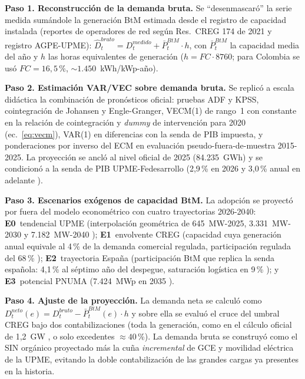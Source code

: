 \documentclass[11pt,letterpaper]{article}
\begin{document}
\textbf{Paso 1. Reconstrucción de la demanda bruta.} Se ``desenmascaró''
la serie medida sumándole la generación BtM estimada desde el registro de
capacidad instalada (reportes de operadores de red según Res.~CREG 174 de
2021 \cite{creg174} y registro AGPE-UPME):
$\widehat{D}^{bruto}_t = D^{medido}_t + \bar{P}^{BtM}_t\cdot h$, con
$\bar{P}^{BtM}_t$ la capacidad media del año y $h$ las horas equivalentes de
generación ($h=FC\cdot8760$; para Colombia se usó $FC=16{,}5$\,\%,
${\sim}1.450$~kWh/kWp-año).

\textbf{Paso 2. Estimación VAR/VEC sobre demanda bruta.} Se replicó a
escala didáctica la combinación de pronósticos oficial: pruebas ADF y KPSS,
cointegración de Johansen y Engle-Granger, VECM(1) de rango~1 con constante
en la relación de cointegración y \emph{dummy} de intervención para 2020
(ec.~\ref{eq:vecm}), VAR(1) en diferencias con la senda de PIB impuesta, y
ponderaciones por inverso del ECM en evaluación pseudo-fuera-de-muestra
2015-2025. La proyección se ancló al nivel oficial de 2025 (84.235~GWh) y
se condicionó a la senda de PIB UPME-Fedesarrollo (2,9\,\% en 2026 y
3,0\,\% anual en adelante \cite{upmeene2026}).

\textbf{Paso 3. Escenarios exógenos de capacidad BtM.} La adopción se
proyectó por fuera del modelo econométrico con cuatro trayectorias
2026-2040: \textbf{E0}~tendencial UPME (interpolación geométrica de
645~MW-2025, 3.331~MW-2030 y 7.182~MW-2040 \cite{upme2026,upmeene2026});
\textbf{E1}~envolvente CREG (capacidad cuya generación anual equivale al
4\,\% de la demanda comercial regulada, participación regulada del 68\,\%
\cite{upme2024}); \textbf{E2}~trayectoria España (participación BtM que
replica la senda española: 4,1\,\% al séptimo año del despegue, saturación
logística en 9\,\% \cite{appa2025}); y \textbf{E3}~potencial PNUMA
(7.424~MWp en 2035 \cite{pnuma2021}).

\textbf{Paso 4. Ajuste de la proyección.} La demanda neta se calculó como
$D^{neto}_t(e)=D^{bruto}_t-\bar{P}^{BtM}_t(e)\cdot h$ y sobre ella se evaluó
el cruce del umbral CREG bajo dos contabilizaciones (toda la generación,
como en el cálculo oficial de 1,2~GW \cite{creg901099}, o solo excedentes
${\approx}40$\,\%). La demanda bruta se construyó como el SIN orgánico
proyectado más la cuña \emph{incremental} de GCE y movilidad eléctrica de la
UPME, evitando la doble contabilización de las grandes cargas ya presentes
en la historia.
\end{document}
